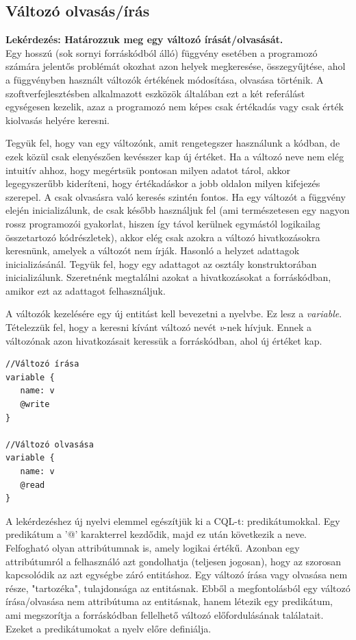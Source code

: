 \documentclass[a4paper,12pt]{report}
\begin{document}
\subsection{Változó olvasás/írás}
\textbf{Lekérdezés: Határozzuk meg egy változó írását/olvasását.}
\\
Egy hosszú (sok sornyi forráskódból álló) függvény esetében a programozó számára jelentős problémát okozhat azon helyek megkeresése, összegyűjtése, ahol a függvényben használt változók értékének módosítása, olvasása történik. A szoftverfejlesztésben alkalmazott eszközök általában ezt a két referálást egységesen kezelik, azaz a programozó nem képes csak értékadás vagy csak érték kiolvasás helyére keresni. 
\par Tegyük fel, hogy van egy változónk, amit rengetegszer használunk a kódban, de ezek közül csak elenyészően kevésszer kap új értéket. Ha a változó neve nem elég intuitív ahhoz, hogy megértsük pontosan milyen adatot tárol, akkor legegyszerűbb kideríteni, hogy értékadáskor a jobb oldalon milyen kifejezés szerepel. A csak olvasásra való keresés szintén fontos. Ha egy változót a függvény elején inicializálunk, de csak később használjuk fel (ami természetesen egy nagyon rossz programozói gyakorlat, hiszen így távol kerülnek egymástól logikailag összetartozó kódrészletek), akkor elég csak azokra a változó hivatkozásokra keresnünk, amelyek a változót nem írják. Hasonló a helyzet adattagok inicializásánál. Tegyük fel, hogy egy adattagot az osztály konstruktorában inicializálunk. Szeretnénk megtalálni azokat a hivatkozásokat a forráskódban, amikor ezt az adattagot felhasználjuk.
\par A változók kezelésére egy új entitást kell bevezetni a nyelvbe. Ez lesz a \textit{variable}. Tételezzük fel, hogy a keresni kívánt változó nevét \textit{v}-nek hívjuk. Ennek a változónak azon hivatkozásait keressük a forráskódban, ahol új értéket kap.
\begin{verbatim}
//Változó írása
variable {
   name: v
   @write
}

//Változó olvasása
variable {
   name: v
   @read
}
\end{verbatim}
\par A lekérdezéshez új nyelvi elemmel egészítjük ki a CQL-t: predikátumokkal. Egy predikátum a '@' karakterrel kezdődik, majd ez után következik a neve. Felfogható olyan attribútumnak is, amely logikai értékű. Azonban egy attribútumról a felhasználó azt gondolhatja (teljesen jogosan), hogy az szorosan kapcsolódik az azt egységbe záró entitáshoz. Egy változó írása vagy olvasása nem része, "tartozéka", tulajdonsága az entitásnak. Ebből a megfontolásból egy változó írása/olvasása nem attribútuma az entitásnak, hanem létezik egy predikátum, ami megszorítja a forráskódban fellelhető változó előfordulásának találatait. Ezeket a predikátumokat a nyelv előre definiálja.
\end{document}

